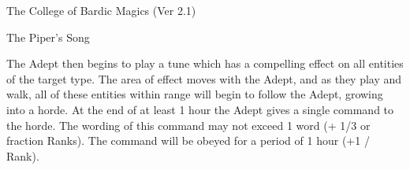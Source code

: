 \begin{Chapter}{The College of Bardic Magics (Ver 2.1)}
\begin{ritual}[R-4]{The Piper’s Song}
\begin{effects}
The Adept then begins to play a tune which has a compelling effect on
all entities of the target type. The area of effect moves with the
Adept, and as they play and walk, all of these entities within range
will begin to follow the Adept, growing into a horde.  At the end of
at least 1 hour the Adept gives a single command to the horde.  The
wording of this command may not exceed 1 word (+ 1/3 or fraction
Ranks).  The command will be obeyed for a period of 1 hour (+1 /
Rank).
\end{effects}
\end{ritual}

\end{Chapter}
